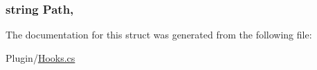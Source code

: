 \subsubsection[{Path}]{\setlength{\rightskip}{0pt plus 5cm}string Path\hspace{0.3cm}{\ttfamily [get]}, {\ttfamily [set]}}\label{structOTA_1_1Plugin_1_1HookArgs_1_1PluginLoadRequest_af331ba015acf9191899985a835008b9d}


The documentation for this struct was generated from the following file\+:\begin{DoxyCompactItemize}
\item 
Plugin/\hyperlink{Hooks_8cs}{Hooks.\+cs}\end{DoxyCompactItemize}
